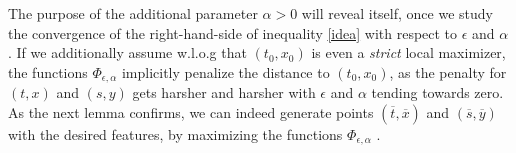 		 The purpose of the additional parameter $ \alpha > 0 $ will reveal itself, once we study the convergence of the right-hand-side of inequality \ref{idea} with respect to $ \epsilon $ and $ \alpha $. 
		 If we additionally assume w.l.o.g that $ (t_0, x_0) $ is even a \emph{strict} local maximizer, the functions $ \Phi_{\epsilon, \alpha} $ implicitly penalize the distance to $ (t_0, x_0) $, as the penalty for $ (t, x) $ and $ (s, y) $ gets harsher and harsher with $ \epsilon $ and $ \alpha $ tending towards zero. As the next lemma confirms, we can indeed generate points $ (\overline{t}, \overline{x}) $ and $ (\overline{s}, \overline{y}) $ with the desired features, by maximizing the functions $ \Phi_{\epsilon, \alpha} $ .